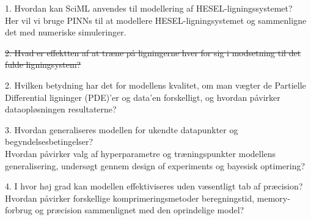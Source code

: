 1. Hvordan kan SciML anvendes til modellering af HESEL-ligningssystemet?\\ \ignorespaces
Her vil vi bruge PINNs til at modellere HESEL-ligningsystemet og sammenligne det med numeriske simuleringer.

\sout{2. Hvad er effektten af at træne på ligningerne hver for sig i modsetning til det fulde ligningsystem?}

2. Hvilken betydning har det for modellens kvalitet, om man vægter de Partielle Differential ligninger (PDE)'er og data'en forskelligt, og hvordan påvirker dataopløsningen resultaterne?

3. Hvordan generaliseres modellen for ukendte datapunkter og begyndelsesbetingelser?\\ \ignorespaces
Hvordan påvirker valg af hyperparametre og træningspunkter modellens generalisering, undersøgt gennem design of experiments og bayesisk optimering?

4. I hvor høj grad kan modellen effektiviseres uden væsentligt tab af præcision?\\ \ignorespaces
Hvordan påvirker forskellige komprimeringsmetoder beregningstid, memory-forbrug og præcision sammenlignet med den oprindelige model?
